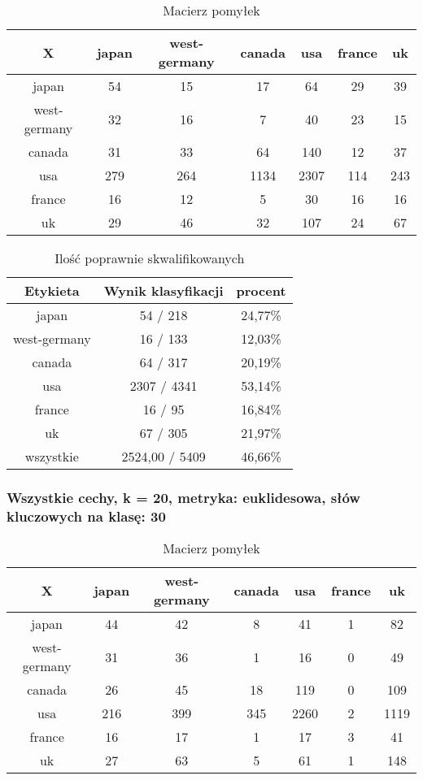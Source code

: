 \documentclass{classrep}
\begin{document}
\begin{table}[h]
\centering
\begin{tabular}{|c|c|c|c|c|c|c|}
\hline
 X  & japan & west-germany & canada & usa & france & uk\\
\hline
japan & 54 & 15 & 17 & 64 & 29 & 39\\
\hline
west-germany & 32 & 16 & 7 & 40 & 23 & 15\\
\hline
canada & 31 & 33 & 64 & 140 & 12 & 37\\
\hline
usa & 279 & 264 & 1134 & 2307 & 114 & 243\\
\hline
france & 16 & 12 & 5 & 30 & 16 & 16\\
\hline
uk & 29 & 46 & 32 & 107 & 24 & 67\\
\hline
\end{tabular}
\caption{Macierz pomyłek}\end{table}

\begin{table}[h]
\centering
\begin{tabular}{|c|c|c|}
\hline
Etykieta & Wynik klasyfikacji & procent\\
\hline
japan & 54 / 218 & 24,77\%\\
\hline
west-germany & 16 / 133 & 12,03\%\\
\hline
canada & 64 / 317 & 20,19\%\\
\hline
usa & 2307 / 4341 & 53,14\%\\
\hline
france & 16 / 95 & 16,84\%\\
\hline
uk & 67 / 305 & 21,97\%\\
\hline
wszystkie & 2524,00 / 5409 & 46,66\%\\
\hline
\end{tabular}
\caption{Ilość poprawnie skwalifikowanych}
\end{table}





\newpage
\subsubsection{Wszystkie cechy, k = 20, metryka: euklidesowa, słów kluczowych na klasę: 30}

\begin{table}[h]
\centering
\begin{tabular}{|c|c|c|c|c|c|c|}
\hline
 X  & japan & west-germany & canada & usa & france & uk\\
\hline
japan & 44 & 42 & 8 & 41 & 1 & 82\\
\hline
west-germany & 31 & 36 & 1 & 16 & 0 & 49\\
\hline
canada & 26 & 45 & 18 & 119 & 0 & 109\\
\hline
usa & 216 & 399 & 345 & 2260 & 2 & 1119\\
\hline
france & 16 & 17 & 1 & 17 & 3 & 41\\
\hline
uk & 27 & 63 & 5 & 61 & 1 & 148\\
\hline
\end{tabular}
\caption{Macierz pomyłek}\end{table}
\end{document}
